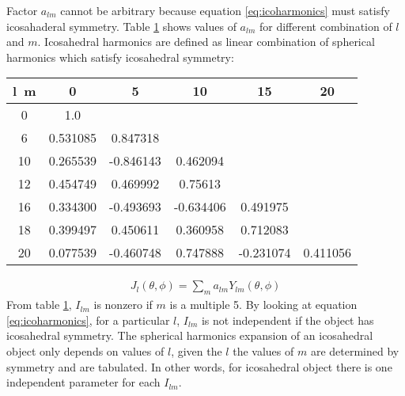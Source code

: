 Factor $a_{lm}$ cannot be arbitrary because equation \ref{eq:icoharmonics} must satisfy icosahaderal symmetry\cite{harisonjack}. Table \ref{tab:spico} shows values of $a_{lm}$ for different combination of $l$ and $m$. Icosahedral harmonics are defined as linear combination of spherical harmonics which satisfy icosahedral symmetry:  
\begin{table}[h]
\begin{center}
  \begin{tabular}{ | c | c  | c | c | c | c |}
    \hline
    l\ m & 0 & 5 & 10 & 15 & 20  \\  \hline
    0 & 1.0 & & & &  \\  \hline
    6 & 0.531085 & 0.847318 & & & \\  \hline 
    10 &0.265539 &-0.846143 &0.462094 & & \\  \hline 
    12 &0.454749 &0.469992 &0.75613 & & \\  \hline 
    16 &0.334300 &-0.493693 &-0.634406 &0.491975 &\\  \hline 
    18 &0.399497 &0.450611 &0.360958 &0.712083 &\\  \hline 
    20 &0.077539 &-0.460748 &0.747888 &-0.231074 &0.411056\\  \hline 
    \hline
  \end{tabular}
\end{center}
\label{tab:spico}
\end{table}
\begin{eqnarray}
J_{l}(\theta,\phi)=\sum_{m} a_{lm} Y_{lm}(\theta,\phi)
\label{eq:icoharmonics}
\end{eqnarray}
From table \ref{tab:spico}, $I_{lm}$ is nonzero if $m$ is a multiple 5. By looking at equation \ref{eq:icoharmonics}, for a particular $l$, $I_{lm}$ is not independent if the object has icosahedral symmetry. The spherical harmonics expansion of an icosahedral object only depends on values of $l$, given the $l$ the values of $m$ are determined by symmetry and are tabulated. In other words, for icosahedral object there is one independent parameter for each $I_{lm}$.

